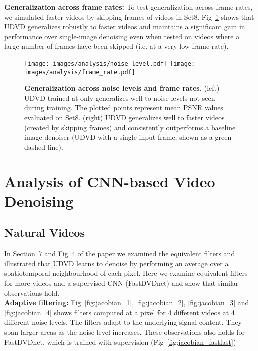 \documentclass[final]{cvpr}
\begin{document}
\noindent \textbf{Generalization across frame rates:} To test generalization across frame rates, we simulated faster videos by skipping frames of videos in Set8. Fig~\ref{fig:noise_frame_gen} shows that UDVD generalizes robustly to faster videos and maintains a significant gain in performance over single-image denoising even when tested on videos where a large number of frames have been skipped (i.e. at a very low frame rate).

\begin{figure}
    \centering
    \texttt{[image: images/analysis/noise\_level.pdf]}
    \texttt{[image: images/analysis/frame\_rate.pdf]}
    \caption{\textbf{Generalization across noise levels and frame rates.} (left) UDVD trained at only  generalizes well to noise levels not seen during training. The plotted points represent mean PSNR values evaluated on Set8. (right) UDVD generalizes well to faster videos (created by skipping frames) and consistently outperforms a baseline image denoiser (UDVD with a single input frame, shown as a green dashed line).}
    \label{fig:noise_frame_gen}
\end{figure}


\section{Analysis of CNN-based Video Denoising}
\label{sec:thorough_analysis}


\subsection{Natural Videos}
\label{sec:filter_natural}
In Section~7 and Fig~4 of the paper we examined the equivalent filters and illustrated that UDVD learns to denoise by performing an average over a spatiotemporal neighbourhood of each pixel. Here we examine equivalent filters for more videos and a supervised CNN (FastDVDnet) and show that similar observations hold. \\

\noindent \textbf{Adaptive filtering:} Fig~\ref{fig:jacobian_1}, \ref{fig:jacobian_2}, \ref{fig:jacobian_3} and \ref{fig:jacobian_4} shows filters computed at a pixel for 4 different videos at 4 different noise levels. The filters adapt to the underlying signal content. They span larger areas as the noise level increases. These observations also holds for FastDVDnet, which is trained with supervision (Fig~\ref{fig:jacobian_fastfast})  \\
\end{document}
